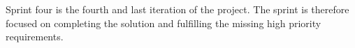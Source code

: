 Sprint four is the fourth and last iteration of the project.
The sprint is therefore focused on completing the solution and fulfilling the missing high priority requirements.

